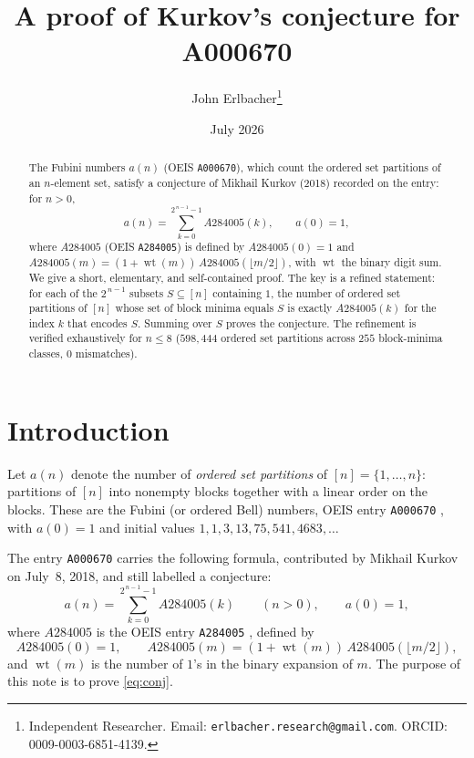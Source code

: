\documentclass[11pt]{article}
\title{A proof of Kurkov's conjecture for A000670}
\author{John Erlbacher\thanks{Independent Researcher. Email:
\texttt{erlbacher.research@gmail.com}. ORCID: 0009-0003-6851-4139.}}
\date{July 2026}
\theoremstyle{definition}
\theoremstyle{remark}
\DeclareMathOperator{\wt}{wt}
\begin{document}
\maketitle

\begin{abstract}
The Fubini numbers $a(n)$ (OEIS \texttt{A000670}), which count the ordered set
partitions of an $n$-element set, satisfy a conjecture of Mikhail Kurkov (2018)
recorded on the entry: for $n>0$,
\[
  a(n)=\sum_{k=0}^{2^{\,n-1}-1} A284005(k),\qquad a(0)=1,
\]
where $A284005$ (OEIS \texttt{A284005}) is defined by $A284005(0)=1$ and
$A284005(m)=(1+\wt(m))\,A284005(\lfloor m/2\rfloor)$, with $\wt$ the binary digit
sum. We give a short, elementary, and self-contained proof. The key is a refined
statement: for each of the $2^{\,n-1}$ subsets $S\subseteq[n]$ containing $1$,
the number of ordered set partitions of $[n]$ whose set of block minima equals
$S$ is exactly $A284005(k)$ for the index $k$ that encodes $S$. Summing over $S$
proves the conjecture. The refinement is verified exhaustively for $n\le 8$
($598{,}444$ ordered set partitions across $255$ block-minima classes, $0$
mismatches).
\end{abstract}

\section{Introduction}\label{sec:intro}

Let $a(n)$ denote the number of \emph{ordered set partitions} of $[n]=\{1,\dots,n\}$:
partitions of $[n]$ into nonempty blocks together with a linear order on the
blocks. These are the Fubini (or ordered Bell) numbers, OEIS entry
\texttt{A000670} \cite{A000670}, with $a(0)=1$ and initial values
$1,1,3,13,75,541,4683,\dots$

The entry \texttt{A000670} carries the following formula, contributed by
Mikhail Kurkov on July~8, 2018, and still labelled a conjecture:
\begin{equation}\label{eq:conj}
  a(n)=\sum_{k=0}^{2^{\,n-1}-1} A284005(k)\qquad(n>0),\qquad a(0)=1,
\end{equation}
where $A284005$ is the OEIS entry \texttt{A284005} \cite{A284005}, defined by
\begin{equation}\label{eq:a284005}
  A284005(0)=1,\qquad A284005(m)=(1+\wt(m))\,A284005(\lfloor m/2\rfloor),
\end{equation}
and $\wt(m)$ is the number of $1$'s in the binary expansion of $m$. The purpose
of this note is to prove \eqref{eq:conj}.
\end{document}
